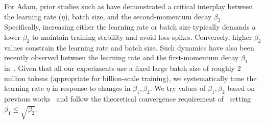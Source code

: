 \documentclass{article}
\begin{document}
For Adam, prior studies such as \citet{wortsman2023stablelowprecisiontraininglargescale} have demonstrated a critical interplay between the learning rate ($\eta$), batch size, and the second-momentum decay $\beta_2$. Specifically, increasing either the learning rate or batch size typically demands a lower $\beta_2$ to maintain training stability and avoid loss spikes. Conversely, higher $\beta_2$ values constrain the learning rate and batch size. Such dynamics have also been recently observed between the learning rate and the first-momentum decay $\beta_1$ in~\citet{pagliardini2025the}. Given that all our experiments use a fixed large batch size of roughly 2 million tokens (appropriate for billion-scale training), we systematically tune the learning rate $\eta$ in response to changes in $\beta_1, \beta_2$. We try values of $\beta_1, \beta_2$ based on previous works~\citep{merrill2025criticalbatchsizerevisited} and follow the theoretical convergence requirement of~\citet{zhang2023adamconvergemodificationupdate} setting $\beta_1 \leq \sqrt{\beta_2}$.
\end{document}
